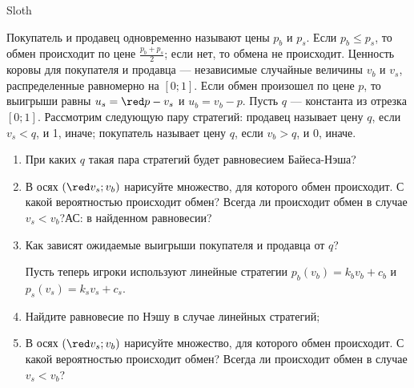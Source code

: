 \begin{problem} \par
\begin{source} Sloth \end{source}
Покупатель и продавец одновременно называют цены  $p_{b} $  и  $p_{s} $. Если  $p_{b} \le p_{s} $, то обмен происходит по цене  $\frac{p_{b} +p_{s} }{2} $; если нет, то обмена не происходит. Ценность коровы для покупателя и продавца — независимые случайные величины  $v_{b} $  и  $v_{s} $, распределенные равномерно на  $\left[0;1\right]$. Если обмен произошел по цене  $p$, то выигрыши равны  $u_{s} ={\red p-v_{s}}$  и  $u_{b} =v_{b} -p$.
Пусть  $q$  — константа из отрезка $\left[0;1\right]$. Рассмотрим следующую пару стратегий: продавец называет цену  $q$, если  $v_{s} <q$, и 1, иначе; покупатель называет цену  $q$, если  $v_{b} >q$, и 0, иначе. \par
\begin{enumerate}
\item	При каких  $q$  такая пара стратегий будет равновесием Байеса-Нэша? \par
\item 	В осях  $\left({\red v_{s}} ;v_{b} \right)$  нарисуйте множество, для которого обмен происходит. С какой вероятностью происходит обмен? Всегда ли происходит обмен в случае  $v_{s} <v_{b}$?{\red АС: в найденном равновесии?} \par
\item 	Как зависят ожидаемые выигрыши покупателя и продавца от $q$?\par
Пусть теперь игроки используют линейные стратегии  $p_{b} \left(v_{b} \right)=k_{b} v_{b} +c_{b} $  и  $p_{s} \left(v_{s} \right)=k_{s} v_{s} +c_{s}$.\par
\item 	Найдите равновесие по Нэшу в случае линейных стратегий; \par
\item 	В осях  $\left({\red v_{s}};v_{b} \right)$  нарисуйте множество, для которого обмен происходит. С какой вероятностью происходит обмен? Всегда ли происходит обмен в случае $v_{s} <v_{b}$?
\end{enumerate}


\begin{sol}

\end{sol}
\end{problem}



